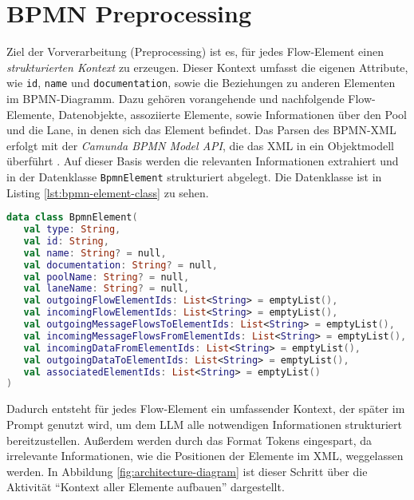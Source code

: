 \section{BPMN Preprocessing}\label{sec:bpmn-preprocessing}

Ziel der Vorverarbeitung (Preprocessing) ist es, für jedes Flow-Element einen \emph{strukturierten Kontext} zu erzeugen. Dieser Kontext umfasst die eigenen Attribute, wie \texttt{id}, \texttt{name} und \texttt{documentation}, sowie die Beziehungen zu anderen Elementen im \ac{BPMN}-Diagramm. Dazu gehören vorangehende und nachfolgende Flow-Elemente, Datenobjekte, assoziierte Elemente, sowie Informationen über den Pool und die Lane, in denen sich das Element befindet. Das Parsen des \ac{BPMN}-XML erfolgt mit der \emph{Camunda BPMN Model API}, die das XML in ein Objektmodell überführt \cite{camunda-bpmn-model-api, camunda-bpmn-model-read}. Auf dieser Basis werden die relevanten Informationen extrahiert und in der Datenklasse \texttt{BpmnElement} strukturiert abgelegt. Die Datenklasse ist in Listing \ref{lst:bpmn-element-class} zu sehen.

\begin{lstlisting}[language=Kotlin,caption={Interne \ac{BPMN}-Repräsentation je Flow-Element.},label={lst:bpmn-element-class}]
data class BpmnElement(
   val type: String,
   val id: String,
   val name: String? = null,
   val documentation: String? = null,
   val poolName: String? = null,
   val laneName: String? = null,
   val outgoingFlowElementIds: List<String> = emptyList(),
   val incomingFlowElementIds: List<String> = emptyList(),
   val outgoingMessageFlowsToElementIds: List<String> = emptyList(),
   val incomingMessageFlowsFromElementIds: List<String> = emptyList(),
   val incomingDataFromElementIds: List<String> = emptyList(),
   val outgoingDataToElementIds: List<String> = emptyList(),
   val associatedElementIds: List<String> = emptyList()
)
\end{lstlisting}

Dadurch entsteht für jedes Flow-Element ein umfassender Kontext, der später im Prompt genutzt wird, um dem \ac{LLM} alle notwendigen Informationen strukturiert bereitzustellen. Außerdem werden durch das Format Tokens eingespart, da irrelevante Informationen, wie die Positionen der Elemente im XML, weggelassen werden. In Abbildung \ref{fig:architecture-diagram} ist dieser Schritt über die Aktivität \enquote{Kontext aller Elemente aufbauen} dargestellt.